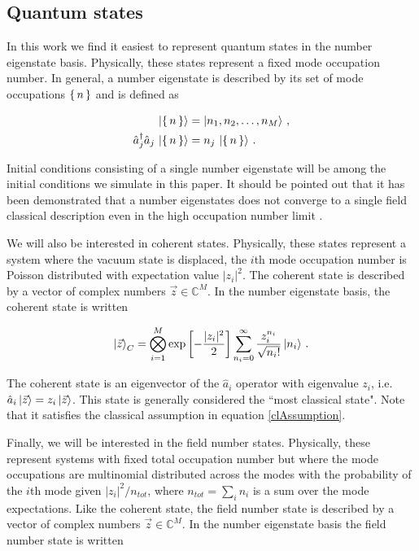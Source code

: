 \documentclass[aps,prd,twocolumn,superscriptaddress]{revtex4-1}
\begin{document}
\subsection{Quantum states}

In this work we find it easiest to represent quantum states in the number eigenstate basis. Physically, these states represent a fixed mode occupation number. In general, a number eigenstate is described by its set of mode occupations $\set{n}$ and is defined as

\begin{align} \label{numEigenstate}
    \ket{\set{n}} &= \ket{n_1, n_2, \dots, n_{M}} \, , \\
    \hat a_j^\dagger \hat a_j \,  \ket{\set{n}} &= n_j \, \ket{\set{n}} \, .
\end{align}

Initial conditions consisting of a single number eigenstate will be among the initial conditions we simulate in this paper. It should be pointed out that it has been demonstrated that a number eigenstates does not converge to a single field classical description even in the high occupation number limit \cite{Sikivie2017, Hertzberg2016}. 

We will also be interested in coherent states. Physically, these states represent a system where the vacuum state is displaced, the $i$th mode occupation number is Poisson distributed with expectation value $|z_i|^2$. The coherent state is described by a vector of complex numbers $\Vec{z} \in \mathbb{C}^M$. In the number eigenstate basis, the coherent state is written 

\begin{equation} \label{coherentStates}
    \ket{\Vec{z}}_C = \bigotimes_{i=1}^M \exp \left[ -\frac{|z_i|^2}{2} \right] \sum_{n_i=0}^\infty \frac{ z_i^{n_i}}{\sqrt{n_i!}} \ket{n_i} \, .
\end{equation}

The coherent state is an eigenvector of the $\hat a_i$ operator with eigenvalue $z_i$, i.e. $\hat a_i \ket{\Vec{z}} = z_i \ket{\Vec{z}}$. This state is generally considered the ``most classical state". Note that it satisfies the classical assumption in equation \ref{clAssumption}.

Finally, we will be interested in the field number states. Physically, these represent systems with fixed total occupation number but where the mode occupations are multinomial distributed across the modes with the probability of the $i$th mode given $|z_i|^2/n_{tot}$, where $n_{tot} = \sum_i n_i$ is a sum over the mode expectations. Like the coherent state, the field number state is described by a vector of complex numbers $\Vec{z} \in \mathbb{C}^M$. In the number eigenstate basis the field number state is written 
\end{document}
